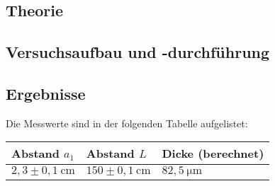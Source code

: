     \subsection{Theorie}
    \subsection{Versuchsaufbau und -durchführung}
        

    
    \subsection{Ergebnisse}

        Die Messwerte sind in der folgenden Tabelle aufgelistet:

        \begin{table}[H]
            \centering
            \begin{tabular}{|l|l|l|}
                \hline
                Abstand $a_{1}$ & Abstand $L$ & Dicke (berechnet)\\
                \hline
                $2,3 \pm 0,1\ \mathrm{cm}$ & $150 \pm 0,1\ \mathrm{cm}$ & $82,5\ \mathrm{\mu m}$\\
                \hline
            \end{tabular}
        \end{table}


